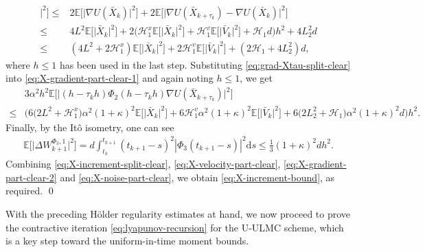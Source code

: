 \documentclass[12pt]{article}
\numberwithin{equation}{section}
\renewenvironment{proof}%
  {\begin{trivlist}%
   \item[]\ignorespaces}%
  {\qed\end{trivlist}}
\renewcommand{\H}{\mathcal{H}}
\begin{document}
\begin{proof}
\begin{equation}
\begin{aligned}
\big|^2
\Big]
\leq   &
2
\mathbb{E}
\Big[
\big|
\nabla U(\bar{X}_k)
\big|^2
\Big]
+
2\mathbb{E}
\Big[
\big|
\nabla U(\bar{X}_{k+\tau_k})
-
\nabla U(\bar{X}_k)
\big|^2
\Big]
\\   
\leq   &
4 L^2
\mathbb{E}
\Big[
\big|
\bar{X}_k
\big|^2
\Big]
+
2
\Big( 
\H^{x}_1
\mathbb{E}
\Big[\big|
\bar{X}_k
\big|^2\Big]
+
\H^{v}_1
\mathbb{E}
\Big[\big|
\bar{V}_k
\big|^2\Big]
+
\H_1
d
\Big)h^2
+
4 L_2^2  d
\\ 
\leq   &
(4 L^2
+
2\H^{x}_1)
\mathbb{E}
\Big[\big|
\bar{X}_k
\big|^2\Big]
+
2 
\H^{v}_1
\mathbb{E}
\Big[\big|
\bar{V}_k
\big|^2\Big]
+
( 
2\H_1  +  
4 L_2^2 
)
d,
\end{aligned}
\end{equation}
where $h \leq  1$ has been used in the last step.
Substituting \eqref{eq:grad-Xtau-split-clear} into \eqref{eq:X-gradient-part-clear-1} and again noting $h\leq 1$, we get
\begin{equation}
\label{eq:X-gradient-part-clear-2}
\begin{aligned}
&3
\alpha^2
h^2
\mathbb{E}
\Big[
\big|
(h-\tau_kh)\Phi_2(h-\tau_kh)
\nabla U(\bar{X}_{k+\tau_k})
\big|^2
\Big]
\\  
\leq   &
\Big(
6
\big(
2L^2 +  \H^{x}_1
\big)
\alpha^2
(1+\kappa)^2
\mathbb{E}
\Big[
\big|
\bar{X}_k
\big|^2
\Big]
+
6 \H^{v}_1 
\alpha^2
(1+\kappa)^2
\mathbb{E}
\Big[
\big|
\bar{V}_k
\big|^2
\Big]
+
6\big(
2L_2^2+  \H_1
\big)
\alpha^2
(1+\kappa)^2d
\Big)
h^2
.
\end{aligned}
\end{equation}
Finally, by the It\^o isometry, one can see
\begin{equation}
\label{eq:X-noise-part-clear}
\begin{aligned}
\mathbb{E}
\Big[
\big|
\Delta W_{k+1}^{\Phi_3,1}
\big|^2
\Big]
=
d
\int_{t_k}^{t_{k+1}}
(t_{k+1}-s)^2
|\Phi_3(t_{k+1}-s)|^2
\mathrm{d}s
\leq
\tfrac{1}{3}
(1+\kappa)^2 dh^2 .
\end{aligned}
\end{equation}
Combining \eqref{eq:X-increment-split-clear}, \eqref{eq:X-velocity-part-clear}, \eqref{eq:X-gradient-part-clear-2} and \eqref{eq:X-noise-part-clear}, we obtain \eqref{eq:X-increment-bound},
as required.
\end{proof}





With the preceding H\"older regularity estimates at hand, we now proceed to prove the contractive iteration \eqref{eq:lyapunov-recursion} for the U-ULMC scheme, which is a key step toward the uniform-in-time moment bounds.
\end{document}
